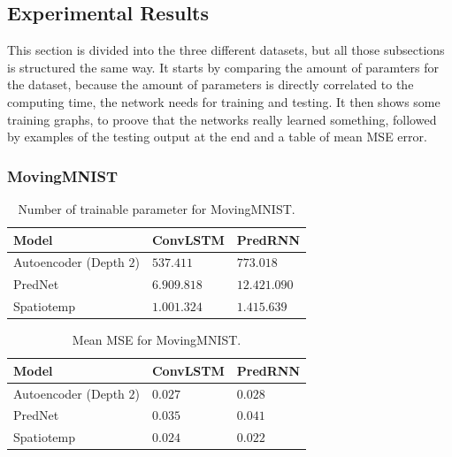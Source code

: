  \subsection{Experimental Results}
  This section is divided into the three different datasets, but all those subsections is structured the same way. It starts by comparing the amount of paramters
  for the dataset, because the amount of parameters is directly correlated to the computing time, the network needs for training and testing. It then shows
  some training graphs, to proove that the networks really learned something, followed by examples of the testing output at the end and a table of mean MSE error. 
 
  \subsubsection{MovingMNIST}
   \begin{table}[H]
    \begin{center}
     \begin{tabular}{| l | l | l |}\hline
      \textbf{Model} & \textbf{ConvLSTM} & \textbf{PredRNN} \\\hline
      Autoencoder (Depth $2$) & $537.411$ & $773.018$ \\\hline
      PredNet & $6.909.818$ & $12.421.090$ \\\hline
      Spatiotemp & $1.001.324$ & $1.415.639$ \\\hline
     \end{tabular}
    \end{center}
    \caption{Number of trainable parameter for MovingMNIST.}
   \end{table}\noindent
   \begin{table}[H]
    \begin{center}
     \begin{tabular}{| l | l | l |}\hline
      \textbf{Model} & \textbf{ConvLSTM} & \textbf{PredRNN} \\\hline
      Autoencoder (Depth $2$) & $0.027$ & $0.028$ \\\hline
      PredNet & $0.035$ & $0.041$ \\\hline
      Spatiotemp & $0.024$ & $0.022$ \\\hline
     \end{tabular}
    \end{center}
    \caption{Mean MSE for MovingMNIST.}
   \end{table}
   
